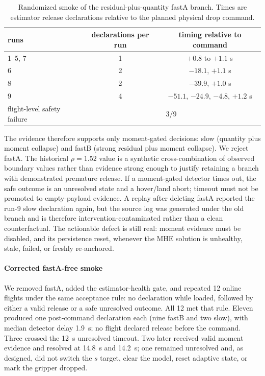 \begin{table}[t]
\caption{Randomized smoke of the residual-plus-quantity fastA branch. Times are estimator
release declarations relative to the planned physical drop command.}
\label{tab:fasta-smoke}
\centering
\begin{tabular}{@{}lcc@{}}
\toprule
runs & declarations per run & timing relative to command \\
\midrule
1--5, 7 & 1 & $+0.8$ to $+1.1$ s \\
6 & 2 & $-18.1$, $+1.1$ s \\
8 & 2 & $-39.9$, $+1.0$ s \\
9 & 4 & $-51.1$, $-24.9$, $-4.8$, $+1.2$ s \\
\midrule
flight-level safety failure & \multicolumn{2}{c}{3/9} \\
\bottomrule
\end{tabular}
\end{table}

The evidence therefore supports only moment-gated decisions: slow
(quantity plus moment collapse) and fastB (strong residual plus moment collapse). We reject
fastA. The historical $\rho=1.52$ value is a synthetic cross-combination of observed boundary
values rather than evidence strong enough to justify retaining a branch with demonstrated
premature release. If a moment-gated detector times out, the safe outcome is an unresolved
state and a hover/land abort; timeout must not be promoted to empty-payload evidence. A replay
after deleting fastA reported the run-9 slow declaration again, but the source log was generated
under the old branch and is therefore intervention-contaminated rather than a clean
counterfactual. The actionable defect is still real: moment evidence must be disabled, and its
persistence reset, whenever the MHE solution is unhealthy, stale, failed, or freshly re-anchored.

\paragraph{Corrected fastA-free smoke} We removed fastA, added the estimator-health gate, and
repeated 12 online flights under the same acceptance rule: no declaration while loaded, followed
by either a valid release or a safe unresolved outcome. All 12 met that rule. Eleven produced one
post-command declaration each (nine fastB and two slow), with median detector delay
\SI{1.9}{s}; no flight declared release before the command. Three crossed the \SI{12}{s}
unresolved timeout. Two later received valid moment evidence and resolved at \SI{14.8}{s} and
\SI{14.2}{s}; one remained unresolved and, as designed, did not switch the $s$ target, clear the
model, reset adaptive state, or mark the gripper dropped.

